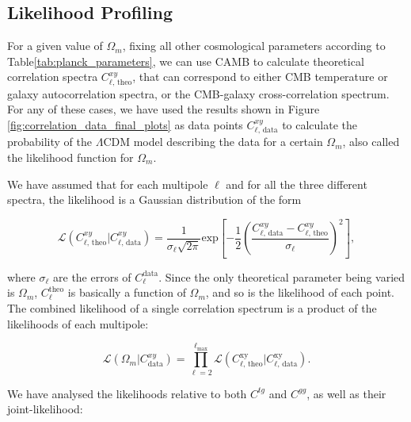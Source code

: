 \documentclass[openany,a4paper,12pt,oneside]{book}
\begin{document}
\begin{spacing}{1.5}


\section{Likelihood Profiling}

For a given value of $\Omega_m$, fixing all other cosmological parameters according to Table\ref{tab:planck_parameters}, we can use CAMB to calculate theoretical correlation spectra $C_{\ell\text{, theo}}^{xy}$, that can correspond to either CMB temperature or galaxy autocorrelation spectra, or the CMB-galaxy cross-correlation spectrum. For any of these cases, we have used the results shown in Figure \ref{fig:correlation_data_final_plots} as data points $C_{\ell\text{, data}}^{xy}$ to calculate the probability of the $\Lambda$CDM model describing the data for a certain $\Omega_m$, also called the likelihood function for $\Omega_m$. 

We have assumed that for each multipole $\ell$ and for all the three different spectra, the likelihood is a Gaussian distribution of the form

\begin{equation}\label{likelihood_cl}
	\mathcal{L}(C_{\ell\text{, theo}}^{xy}|C_{\ell\text{, data}}^{xy})=\frac{1}{\sigma_\ell \sqrt{2\pi}}\text{exp}\left[-\frac{1}{2}\left(\frac{C_{\ell\text{, data}}^{xy}-C_{\ell\text{, theo}}^{xy}}{\sigma_\ell}\right)^2\right],
\end{equation}

\noindent where $\sigma_\ell$ are the errors of $C_\ell^\text{data}$. Since the only theoretical parameter being varied is $\Omega_m$, $C_\ell^\text{theo}$ is basically a function of $\Omega_m$, and so is the likelihood of each point. The combined likelihood of a single correlation spectrum is a product of the likelihoods of each multipole:

\begin{equation}\label{likelihood_cxy}
	\mathcal{L}(\Omega_m|C^{xy}_\text{data})=\prod_{\ell=2}^{\ell_\text{max}} \mathcal{L}(C_{\ell\text{, theo}}^\text{xy}|C_{\ell\text{, data}}^\text{xy}).
\end{equation}

We have analysed the likelihoods relative to both $C^{tg}$ and $C^{gg}$, as well as their joint-likelihood:


\end{spacing}
\end{document}
